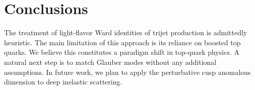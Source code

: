 \section{Conclusions}\label{sec:conclusions}

The treatment of light-flavor Ward identities of trijet production is
admittedly heuristic. The main limitation of this approach is its
reliance on boosted top quarks. We believe this constitutes a paradigm
shift in top-quark physics. A natural next step is to match Glauber
modes without any additional assumptions. In future work, we plan to
apply the perturbative cusp anomalous dimension to deep inelastic
scattering.

